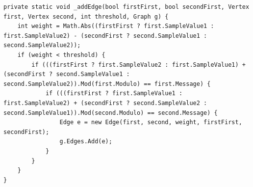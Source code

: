 \begin{lstlisting}[firstnumber=482,label=lst:newAddEdge, caption={The improved \lstinline|_addEdge| method. From second round JPEGImage.cs.}]
private static void _addEdge(bool firstFirst, bool secondFirst, Vertex first, Vertex second, int threshold, Graph g) {
    int weight = Math.Abs((firstFirst ? first.SampleValue1 : first.SampleValue2) - (secondFirst ? second.SampleValue1 : second.SampleValue2));
    if (weight < threshold) {
        if (((firstFirst ? first.SampleValue2 : first.SampleValue1) + (secondFirst ? second.SampleValue1 : second.SampleValue2)).Mod(first.Modulo) == first.Message) {
            if (((firstFirst ? first.SampleValue1 : first.SampleValue2) + (secondFirst ? second.SampleValue2 : second.SampleValue1)).Mod(second.Modulo) == second.Message) {
                Edge e = new Edge(first, second, weight, firstFirst, secondFirst);
                g.Edges.Add(e);
            }
        }
    }
}
\end{lstlisting}

